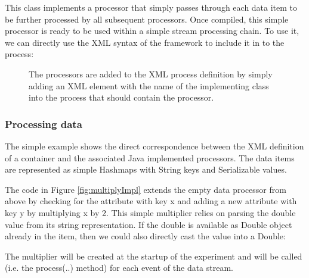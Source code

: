 This class implements a processor that simply passes through each data
item to be further processed by all subsequent processors.  Once
compiled, this simple processor is ready to be used within a simple
stream processing chain. To use it, we can directly use the XML syntax
of the \streams framework to include it in to the process:

\begin{figure}[h!]
  \caption{\label{fig:multiplyXML}The processors are added to the XML process definition by simply adding an XML element with the name of the implementing class into the process that should contain the processor.}
\end{figure}


\subsubsection{Processing data}
The simple example shows the direct correspondence between the XML
definition of a container and the associated Java implemented
processors. The data items are represented as simple Hashmaps with
{\ttfamily String} keys and {\ttfamily Serializable} values.

The code in Figure \ref{fig:multiplyImpl} extends the empty data
processor from above by checking for the attribute with key {\ttfamily
x} and adding a new attribute with key {\ttfamily y} by multiplying
{\ttfamily x} by 2. This simple multiplier relies on parsing the double value from its
string representation. If the double is available as Double object
already in the item, then we could also directly cast the value into a
Double:

\begin{figure}[h!]
\end{figure}

The multiplier will be created at the startup of the experiment and
will be called (i.e. the {\ttfamily process(..)} method) for each
event of the data stream.

